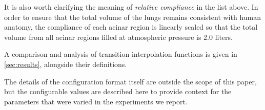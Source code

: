 It is also worth clarifying the meaning of \textit{relative compliance} in the list above. In order
to ensure that the total volume of the lungs remains consistent with human anatomy, the compliance
of each acinar region is linearly scaled so that the total volume from all acinar regions filled at
atmospheric pressure is 2.0 liters.


\breakpars

A comparison and analysis of transition interpolation functions is given in \autoref{sec:results},
alongside their definitions.

\breakpars

The details of the configuration format itself are outside the scope of this paper, but the
configurable values are described here to provide context for the parameters that were varied in the
experiments we report.
